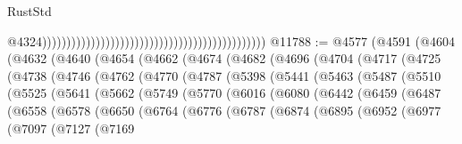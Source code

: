 \begin{lexlean}{RustStd}
\begin{coremodule}
                                                                                                @4324))))))))))))))))))))))))))))))))))))))))))))))
@11788 := @4577
    (@4591
      (@4604
        (@4632
          (@4640
            (@4654
              (@4662
                (@4674
                  (@4682
                    (@4696
                      (@4704
                        (@4717
                          (@4725
                            (@4738
                              (@4746
                                (@4762
                                  (@4770
                                    (@4787
                                      (@5398
                                        (@5441
                                          (@5463
                                            (@5487
                                              (@5510
                                                (@5525
                                                  (@5641
                                                    (@5662
                                                      (@5749
                                                        (@5770
                                                          (@6016
                                                            (@6080
                                                              (@6442
                                                                (@6459
                                                                  (@6487
                                                                    (@6558
                                                                      (@6578
                                                                        (@6650
                                                                          (@6764
                                                                            (@6776
                                                                              (@6787
                                                                                (@6874
                                                                                  (@6895
                                                                                    (@6952
                                                                                      (@6977
                                                                                        (@7097
                                                                                          (@7127
                                                                                            (@7169

\end{coremodule}
\end{lexlean}
